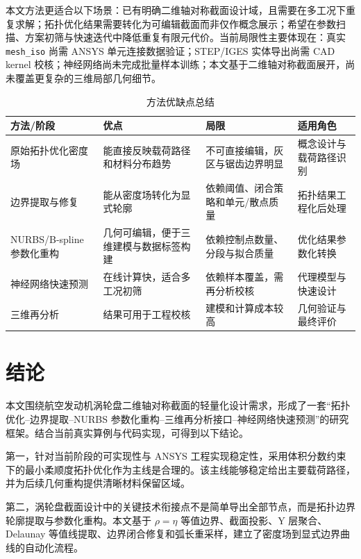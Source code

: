 \documentclass{FRB-style}
\newcommand{\codepath}[1]{\texttt{#1}}
\begin{document}
本文方法更适合以下场景：已有明确二维轴对称截面设计域，且需要在多工况下重复求解；拓扑优化结果需要转化为可编辑截面而非仅作概念展示；希望在参数扫描、方案初筛与快速迭代中降低重复有限元代价。当前局限性主要体现在：真实 \codepath{mesh\_iso} 尚需 ANSYS 单元连接数据验证；STEP/IGES 实体导出尚需 CAD kernel 校核；神经网络尚未完成批量样本训练；本文基于二维轴对称截面展开，尚未覆盖更复杂的三维局部几何细节。

\begin{table}[H]
\centering
\caption{方法优缺点总结}
\begin{tabularx}{\textwidth}{p{}p{}p{}X}
\toprule
方法/阶段 & 优点 & 局限 & 适用角色 \\
\midrule
原始拓扑优化密度场 & 能直接反映载荷路径和材料分布趋势 & 不可直接编辑，灰区与锯齿边界明显 & 概念设计与载荷路径识别 \\
边界提取与修复 & 能从密度场转化为显式轮廓 & 依赖阈值、闭合策略和单元/散点质量 & 拓扑结果工程化后处理 \\
NURBS/B-spline 参数化重构 & 几何可编辑，便于三维建模与数据标签构建 & 依赖控制点数量、分段与拟合质量 & 优化结果参数化转换 \\
神经网络快速预测 & 在线计算快，适合多工况初筛 & 依赖样本覆盖，需再分析校核 & 代理模型与快速设计 \\
三维再分析 & 结果可用于工程校核 & 建模和计算成本较高 & 几何验证与最终评价 \\
\bottomrule
\end{tabularx}
\end{table}

\section*{结论}
{}

本文围绕航空发动机涡轮盘二维轴对称截面的轻量化设计需求，形成了一套“拓扑优化--边界提取--NURBS 参数化重构--三维再分析接口--神经网络快速预测”的研究框架。结合当前真实算例与代码实现，可得到以下结论。

第一，针对当前阶段的可实现性与 ANSYS 工程实现稳定性，采用体积分数约束下的最小柔顺度拓扑优化作为主线是合理的。该主线能够稳定给出主要载荷路径，并为后续几何重构提供清晰材料保留区域。

第二，涡轮盘截面设计中的关键技术衔接点不是简单导出全部节点，而是拓扑边界轮廓提取与参数化重构。本文基于 $\rho=\eta$ 等值边界、截面投影、Y 层聚合、Delaunay 等值线提取、边界闭合修复和弧长重采样，建立了密度场到显式边界曲线的自动化流程。
\end{document}
